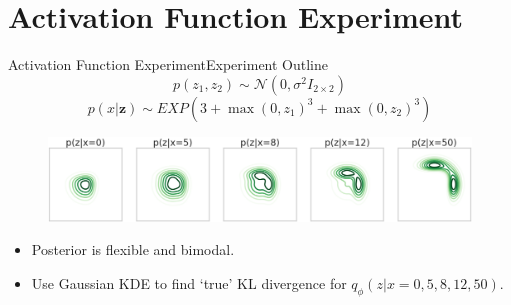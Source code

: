 \documentclass{beamer}
\begin{document}
\section{Activation Function Experiment}
\begin{frame}{Activation Function Experiment}{Experiment Outline}
\[p(z_1,z_2)\sim \mathcal{N} (0,\sigma^2 I_{2\times 2})\]
\[p(x|\bm{z})\sim EXP(3+\max(0,z_1)^3+\max(0,z_2)^3)\]
\begin{figure}[h]
\includegraphics[width=\textwidth]{sprinklertrue.png}
\end{figure}
\begin{itemize}
\item Posterior is flexible and bimodal.
\item Use Gaussian KDE to find `true' KL divergence for $q_\phi(z|x=0,5,8,12,50)$.
\end{itemize}
\end{frame}
\end{document}
